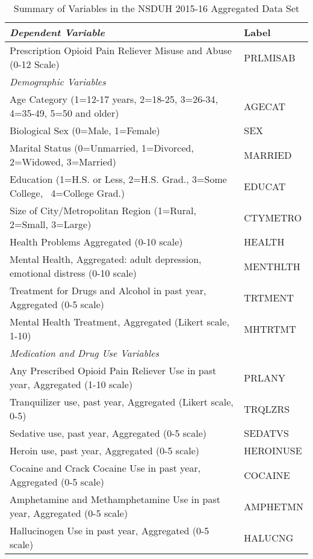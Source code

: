 \documentclass[sigconf]{acmart}
\begin{document}

\begin{table*}[ht]
  \caption{Summary of Variables in the NSDUH 2015-16 Aggregated Data Set}
  \label{tab:freq}
  \begin{tabular}{ll}
    \toprule
    \textit{Dependent Variable} & Label \\
    \midrule
    Prescription Opioid Pain Reliever Misuse and Abuse (0-12 Scale)& PRLMISAB  \\
    \midrule
    \textit{Demographic Variables}&   \\
    \midrule
    Age Category (1=12-17 years, 2=18-25, 3=26-34, 4=35-49, 5=50 and older)& AGECAT \\
    Biological Sex (0=Male, 1=Female)& SEX  \\
    Marital Status (0=Unmarried, 1=Divorced, 2=Widowed, 3=Married)& MARRIED  \\
    Education (1=H.S. or Less, 2=H.S. Grad., 3=Some College,  4=College Grad.)& EDUCAT  \\
    Size of City/Metropolitan Region (1=Rural, 2=Small, 3=Large)& CTYMETRO  \\
    Health Problems Aggregated  (0-10 scale)& HEALTH  \\
    Mental Health, Aggregated: adult depression, emotional distress (0-10 scale)& MENTHLTH  \\
    Treatment for Drugs and Alcohol in past year, Aggregated (0-5 scale)& TRTMENT  \\
    Mental Health Treatment, Aggregated (Likert scale, 1-10)& MHTRTMT  \\
    \midrule
    \textit{Medication and Drug Use Variables}& \\
    \midrule
    Any Prescribed Opioid Pain Reliever Use in past year, Aggregated (1-10 scale)& PRLANY  \\
    Tranquilizer use, past year, Aggregated (Likert scale, 0-5)& TRQLZRS \\
    Sedative use, past year, Aggregated (0-5 scale)& SEDATVS  \\
    Heroin use, past year, Aggregated (0-5 scale)& HEROINUSE  \\
    Cocaine and Crack Cocaine Use in past year, Aggregated  (0-5 scale)& COCAINE  \\
    Amphetamine and Methamphetamine Use in past year, Aggregated (0-5 scale)& AMPHETMN  \\
    Hallucinogen Use in past year, Aggregated (0-5 scale)& HALUCNG \\
    \bottomrule
  \end{tabular}
\end{table*}
\end{document}
